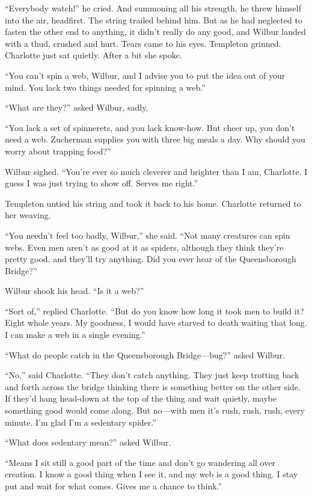 \documentclass[a4paper, oneside]{book}
\begin{document}
``Everybody watch!'' he cried. And summoning all his strength, 
he threw himself into the air, headfirst. The string trailed behind
him. But as he had neglected to fasten the other end to anything, it
didn't really do any good, and Wilbur landed with a thud, crushed
and hurt. Tears came to his eyes. Templeton grinned. Charlotte
just sat quietly. After a bit she spoke. 

``You can’t spin a web, Wilbur, and I advise you to put the idea
out of your mind. You lack two things needed for spinning a web.''

``What are they?'' asked Wilbur, sadly.

``You lack a set of spinnerets, and you lack know-how. But
cheer up, you don't need a web. Zucherman supplies you with three
big meals a day. Why should you worry about trapping food?''

Wilbur sighed. ``You're ever so much cleverer and brighter
than I am, Charlotte. I guess I was just trying to show off. Serves
me right.'' 

Templeton untied his string and took it back to his home. Charlotte
returned to her weaving.

``You needn't feel too badly, Wilbur,'' she said. ``Not many
creatures can spin webs. Even men aren't as good at it as spiders,
although they think they're pretty good, and they'll try anything.
Did you ever hear of the Queensborough Bridge?''

Wilbur shook his head. ``Is it a web?'' 

``Sort of,'' replied Charlotte. ``But do you know how long it took 
men to build it? Eight whole years. My goodness, I would have
starved to death waiting that long. I can make a web in a single
evening.''

``What do people catch in the Queensborough Bridge—bug?''
asked Wilbur. 

``No,'' said Charlotte. ``They don’t catch anything. They just
keep trotting back and forth across the bridge thinking there is
something better on the other side. If they’d hang head-down at
the top of the thing and wait quietly, maybe something good would
come along. But no—with men it’s rush, rush, rush, every minute.
I’m glad I’m a sedentary spider.''

``What does sedentary mean?'' asked Wilbur.

``Means I sit still a good part of the time and don’t go
wandering all over creation. I know a good thing when I see it, and
my web is a good thing. I stay put and wait for what comes. Gives
me a chance to think.'' 
\end{document}
